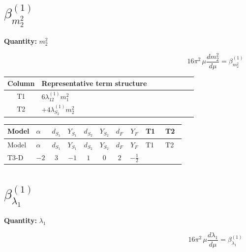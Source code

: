 \documentclass[8pt]{article}
\begin{document}
\begin{landscape}
\section*{$\beta_{m_2^2}^{(1)}$}
\noindent\textbf{Quantity: }$m_2^2$\par\smallskip
\[16\pi^2\,\mu\frac{d m_2^2}{d\mu}=\beta_{m_2^2}^{(1)}\]
\begin{center}
\begin{tabular}{@{}c >{\raggedright\arraybackslash}p{0.82\linewidth}@{}}
\toprule
Column & Representative term structure \\
\midrule
T1 & \(\displaystyle 6 {\lambda_{12}^{(1)}} {m_1^2}\) \\
\midrule
T2 & \(\displaystyle +4 {\lambda_{S_2}^{(1)}} {m_2^2}\) \\
\midrule
\bottomrule
\end{tabular}
\end{center}
\smallskip
\tiny
\begin{longtable}{@{}llcccccc >{\raggedright\arraybackslash}p{0.21\linewidth} >{\raggedright\arraybackslash}p{0.21\linewidth}@{}}
\toprule
Model & $\alpha$ & $d_{S_1}$ & $Y_{S_1}$ & $d_{S_2}$ & $Y_{S_2}$ & $d_F$ & $Y_F$ & T1 & T2 \\
\midrule
\endfirsthead
\toprule
Model & $\alpha$ & $d_{S_1}$ & $Y_{S_1}$ & $d_{S_2}$ & $Y_{S_2}$ & $d_F$ & $Y_F$ & T1 & T2 \\
\midrule
\endhead
T3-D & $-2$ & $3$ & $-1$ & $1$ & $0$ & $2$ & $-\frac{1}{2}$ & \scriptsize\adjustbox{max width=\linewidth}{$\begin{gathered} 6 {\lambda_{12}^{(1)}} {m_1^2}\end{gathered}$} & \scriptsize\adjustbox{max width=\linewidth}{$\begin{gathered} +4 {\lambda_{S_2}^{(1)}} {m_2^2}\end{gathered}$} \\
\midrule
\bottomrule
\end{longtable}
\clearpage
\section*{$\beta_{\lambda_1}^{(1)}$}
\noindent\textbf{Quantity: }$\lambda_1$\par\smallskip
\[16\pi^2\,\mu\frac{d \lambda_1}{d\mu}=\beta_{\lambda_1}^{(1)}\]

\end{landscape}
\end{document}
